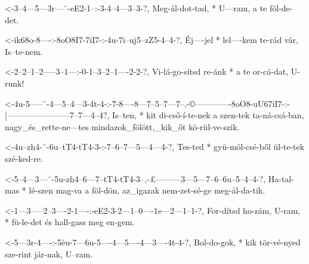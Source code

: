 
  {<-3--4---5---3r---¨-eE2-1--:-3-4--4---3--3-?,}
  {  Meg-ál-dot-tad, * U---ram, a te föl-de-det.}

  {<-ik68o-8----:-8oO8I7-7iI7-:-4u-7i--uj5--zZ5-4--4-?,}
  {  Éj----jel  * lel----kem    te-rád vár, Is--te-nem.}


  {<-2--2--1--2-----3--1---:-0-1--3--2--1----2-2-?,}
  {  Vi-lá-go-sítsd re-ánk * a te or-cá-dat, U-runk!}




  {<-4u-5-----¨-4---5--4---3-4t-4-:-7-8----8---7--5--7---7--,-©-------------8oO8-uU67iI7-:-[-----------------------7--7---4--4?,}
  {  Is--ten, * kit di-cső-í-te-nek a szen-tek ta-ná-csá-ban, nagy_és_rette-ne---tes       mindazok_fölött,_kik_őt kö-rül-ve-szik.}

  {<-4u--zh4-¨-6u--tT4-tT4-3-:-7--6--7---5---4---4-?,}
  {  Tes-ted * gyü-möl-csé-ből ül-te-tek szé-ked-re.}

  {<-5--4---3---¨-5u-zh4--6---7--tT4-tT4-3--,-£---------3---5---7--6--6u--5--4--4-?,}
  {  Ha-tal-mas * lé-szen mag-va a   föl-dön, az_igazak nem-zet-sé-ge meg-ál-da-tik.}



  {<-1---3-----2--3----2-1----:-eE2-3-2---1--0----1e---2---1--1-?,}
  {  For-dítsd ho-zám, U-ram, * fü-le-det és hall-gass meg en-gem.}

  {<-5---3r-4----:-5èu-7---6u-5----4---5----4---3----4t-4-?,}
  {  Bol-do-gok, * kik tör-vé-nyed sze-rint jár-nak, U--ram.}


